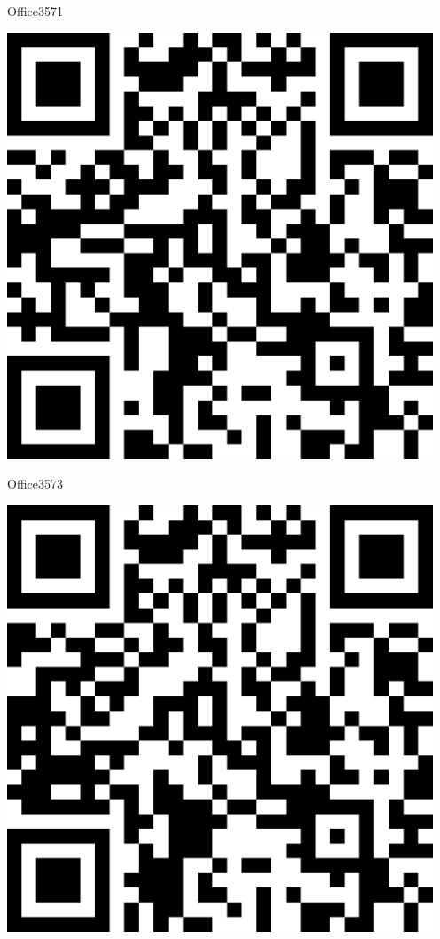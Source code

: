 \documentclass[letterpaper]{article}
\begin{document}
 \hfill{\small Office3571} 

 \vspace{1in} 
 \pagebreak 
{} 
 \vspace*{\fill} 
 \begingroup 
 \centerline{\includegraphics[scale=1,width=5in,height=5in]{Office3573.png}} 
 \endgroup 
 \vspace*{\fill} 

 \hfill{\small Office3573} 

 \vspace{1in} 
 \pagebreak 
{} 
 \vspace*{\fill} 
 \begingroup 
 \centerline{\includegraphics[scale=1,width=5in,height=5in]{Office3575.png}} 
 \endgroup 
 \vspace*{\fill} 
\end{document}
